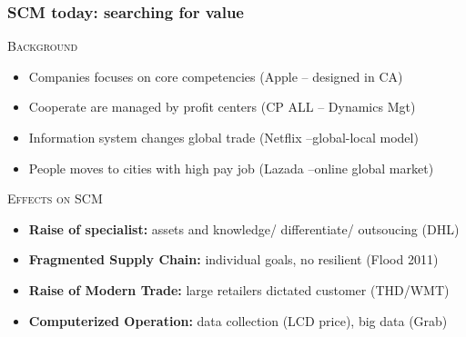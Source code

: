 \documentclass[10pt,handout,notes=show]{beamer}
\begin{document}
\begin{frame}
  \frametitle{SCM today: searching for value}

  \textsc{Background}
  \begin{itemize}
    \item Companies focuses on \alert{core competencies}  (Apple -- designed in CA)
    \item Cooperate are managed by \alert{profit centers} (CP ALL -- Dynamics Mgt)
    \item \alert{Information system} changes \alert{global trade} (Netflix --global-local model)
    \item People moves to \alert{cities} with \alert{high pay} job (Lazada --online global market)
  \end{itemize}

  \NextLine
  \textsc{Effects on SCM}
  \begin{itemize}
    \item \textbf{Raise of specialist:} assets and knowledge/ differentiate/ outsoucing (DHL)
    \item \textbf{Fragmented Supply Chain:} individual goals, no resilient (Flood 2011)
    \item \textbf{Raise of Modern Trade:} large retailers dictated customer (THD/WMT)
    \item \textbf{Computerized Operation:} data collection (LCD price), big data (Grab)
  \end{itemize}


\end{frame}
\end{document}
